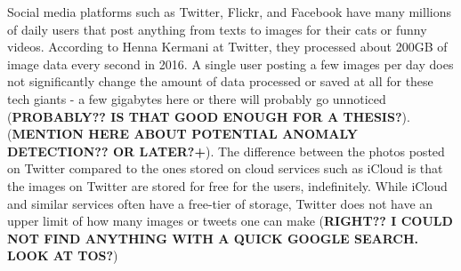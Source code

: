 Social media platforms such as Twitter, Flickr, and Facebook have many millions of daily users that post anything from texts to images for their cats or funny videos. According to Henna Kermani at Twitter, they processed about 200GB of image data every second in 2016\cite{MobileScaleLondona}. A single user posting a few images per day does not significantly change the amount of data processed or saved at all for these tech giants - a few gigabytes here or there will probably go unnoticed (\textbf{PROBABLY?? IS THAT GOOD ENOUGH FOR A THESIS?}). (\textbf{MENTION HERE ABOUT POTENTIAL ANOMALY DETECTION?? OR LATER?+}). The difference between the photos posted on Twitter compared to the ones stored on cloud services such as iCloud is that the images on Twitter are stored for free for the users, indefinitely. While iCloud and similar services often have a free-tier of storage, Twitter does not have an upper limit of how many images or tweets one can make (\textbf{RIGHT?? I COULD NOT FIND ANYTHING WITH A QUICK GOOGLE SEARCH. LOOK AT TOS?})